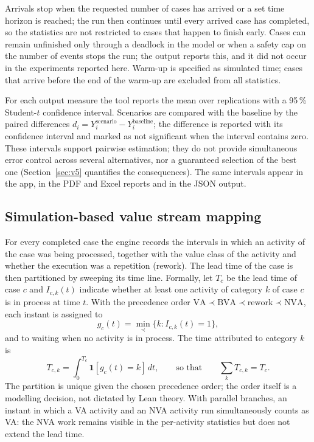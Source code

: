\documentclass[preprint,12pt,nonatbib]{elsarticle}
\begin{document}
Arrivals stop when the requested number of cases has arrived or a set time horizon is reached; the run then continues until every arrived case has completed, so the statistics are not restricted to cases that happen to finish early. Cases can remain unfinished only through a deadlock in the model or when a safety cap on the number of events stops the run; the output reports this, and it did not occur in the experiments reported here. Warm-up is specified as simulated time; cases that arrive before the end of the warm-up are excluded from all statistics.

For each output measure the tool reports the mean over replications with a 95\,\% Student-$t$ confidence interval. Scenarios are compared with the baseline by the paired differences $d_i = Y_i^{\text{scenario}} - Y_i^{\text{baseline}}$; the difference is reported with its confidence interval and marked as not significant when the interval contains zero. These intervals support pairwise estimation; they do not provide simultaneous error control across several alternatives, nor a guaranteed selection of the best one (Section~\ref{sec:v5} quantifies the consequences). The same intervals appear in the app, in the PDF and Excel reports and in the JSON output.

\subsection{Simulation-based value stream mapping}
\label{sec:vsm}
For every completed case the engine records the intervals in which an activity of the case was being processed, together with the value class of the activity and whether the execution was a repetition (rework). The lead time of the case is then partitioned by sweeping its time line. Formally, let $T_c$ be the lead time of case $c$ and $I_{c,k}(t)$ indicate whether at least one activity of category $k$ of case $c$ is in process at time $t$. With the precedence order $\text{VA} \prec \text{BVA} \prec \text{rework} \prec \text{NVA}$, each instant is assigned to
\begin{equation}
g_c(t) = \min_{\prec}\{k : I_{c,k}(t) = 1\},
\end{equation}
and to waiting when no activity is in process. The time attributed to category $k$ is
\begin{equation}
T_{c,k} = \int_0^{T_c} \mathbf{1}[g_c(t) = k]\,dt,
\qquad\text{so that}\qquad
\sum_k T_{c,k} = T_c.
\end{equation}
The partition is unique given the chosen precedence order; the order itself is a modelling decision, not dictated by Lean theory. With parallel branches, an instant in which a VA activity and an NVA activity run simultaneously counts as VA: the NVA work remains visible in the per-activity statistics but does not extend the lead time.
\end{document}
